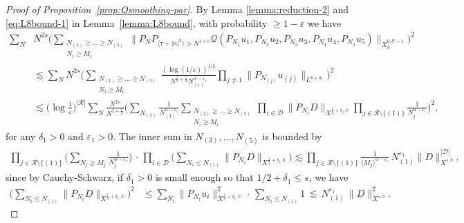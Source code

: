\documentclass[11pt, xcolor = dvipsnames,reqno
]{amsart}
\theoremstyle{definition}
\theoremstyle{remark}
\begin{document}
\begin{proof}[Proof of Proposition~\ref{prop:Qsmoothing-par}]
By Lemma \ref{lemma:reduction-2} and \eqref{eq:L8bound-1} in Lemma~\ref{lemma:L8bound}, with probability $\geq 1 - \varepsilon$ we have
\begin{align}\label{eq:red-par-int1}
    \sum_N
    &N^{2s} 
    \Big( 
    \sum_{\substack{N_{(1)} \geq \ldots\geq N_{(5)} \\ N_i \geq M_i }} \lVert P_N P_{\langle \tau + |n|^2 \rangle > N^{1 + c}} \mathcal{Q}(P_{N_{1}}u_{1}, P_{N_{2}}u_{2}, P_{N_{3}}u_{3}, P_{N_{4}}u_{4}, P_{N_{5}}u_{5}) \rVert_{X^{0,b'-1}_\delta} \Big)^2 \nonumber \\
    & \lesssim \sum_N N^{2s} \Big( \sum_{\substack{N_{(1)} \geq \ldots\geq N_{(5)} \\ N_i \geq M_i }} \frac{(  \log ( 1/\varepsilon) )^{1/2}}{N^{\frac{1}{2} + \frac{c}{4}} N_{(1)}^{\alpha - \varepsilon_1}} \prod_{j \neq 1} \|P_{N_{(j)}} u_{(j)} \|_{L^{8 + \delta_1}} \Big)^2 \nonumber \\
    & \lesssim 
    \Big(\log \frac{1}{\varepsilon}\Big)^{|\mathcal{R}|} \sum_N \frac{N^{2s}}{N^{1 + \frac{c}{2}}} \bigg( \sum_{N_{(1)}}  \frac{1}{N_{(1)}^{\alpha - \varepsilon_1}} \sum_{\substack{N_{(2)} \geq \ldots\geq N_{(5)} \\ N_i \geq M_i }}  \prod_{i \in \mathcal{D}} \|P_{N_{i}} D \|_{X^{\frac{1}{2} + \delta_1,b}} \prod_{j \in \mathcal{R} \setminus \{(1)\}} \frac{1}{N_{j}^{\alpha - \varepsilon_1}} \bigg)^2,
\end{align}
for any $\delta_1 > 0$  and $\varepsilon_1 > 0$. 
The inner sum in $N_{(2)}, \ldots, N_{(5)}$ is bounded by
\begin{align}
    \prod_{j \in \mathcal R \setminus \{(1)\}} \bigg( \sum_{ N_j \geq M_j }  \frac{1}{N_{j}^{\alpha - \varepsilon_1}} \bigg)
    \, \cdot \, 
    \prod_{i \in \mathcal D} \bigg( \sum_{ N_i \leq N_{(1)} } \|P_{N_{i}} D \|_{X^{\frac{1}{2} + \delta_1,b}} \bigg)
    \lesssim 
    \prod_{j \in \mathcal R \setminus \{(1)\}} \frac{1}{\langle M_j \rangle^{\alpha - \varepsilon_1}} \, N_{(1)}^{\varepsilon_1} \|D\|_{X^{s,b}}^{|\mathcal D|},
\end{align}
since by Cauchy-Schwarz, if $\delta_1 >0$ is small enough so that $1/2 + \delta_1 \leq s$, we have 
\begin{align*}
    \Big( \sum_{N_i \leq N_{(1)} } \|P_{N_i} D \|_{X^{\frac{1}{2} + \delta_1 , b}} \Big)^2 
    & \leq \sum_{N_{i}} \|P_{N_{i}} u_{i}\|_{X^{\frac{1}{2} + \delta_1 , b}}^2 \, \cdot \,  \sum_{N_i \leq N_{(1)}} 1
    \, \lesssim \,   N_{(1)}^{\varepsilon_1} \,  \|D\|_{X^{s,b}}^2.

\end{align*}
\end{proof}
\end{document}
